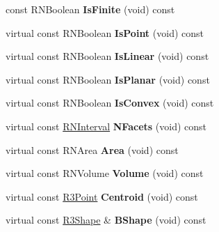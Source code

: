 \begin{DoxyCompactItemize}
\item 
const R\+N\+Boolean {\bfseries Is\+Finite} (void) const \hypertarget{class_r3_cone_a9983889501dc296f35d9a8d601694531}{}\label{class_r3_cone_a9983889501dc296f35d9a8d601694531}

\item 
virtual const R\+N\+Boolean {\bfseries Is\+Point} (void) const \hypertarget{class_r3_cone_ac8b05cdf5dd4f9edb2b68fa11017df2b}{}\label{class_r3_cone_ac8b05cdf5dd4f9edb2b68fa11017df2b}

\item 
virtual const R\+N\+Boolean {\bfseries Is\+Linear} (void) const \hypertarget{class_r3_cone_a075a96de795eaa0bd7d45a76f6596b4f}{}\label{class_r3_cone_a075a96de795eaa0bd7d45a76f6596b4f}

\item 
virtual const R\+N\+Boolean {\bfseries Is\+Planar} (void) const \hypertarget{class_r3_cone_a56722672136a2d5c21834fb7a51a7e78}{}\label{class_r3_cone_a56722672136a2d5c21834fb7a51a7e78}

\item 
virtual const R\+N\+Boolean {\bfseries Is\+Convex} (void) const \hypertarget{class_r3_cone_a2ae431236f7fa452e185af5b2d0f08e7}{}\label{class_r3_cone_a2ae431236f7fa452e185af5b2d0f08e7}

\item 
virtual const \hyperlink{class_r_n_interval}{R\+N\+Interval} {\bfseries N\+Facets} (void) const \hypertarget{class_r3_cone_a180faf8a99d70e07a6d76386f8d8ee90}{}\label{class_r3_cone_a180faf8a99d70e07a6d76386f8d8ee90}

\item 
virtual const R\+N\+Area {\bfseries Area} (void) const \hypertarget{class_r3_cone_af81eded59a3b364cb13f78baee7b249c}{}\label{class_r3_cone_af81eded59a3b364cb13f78baee7b249c}

\item 
virtual const R\+N\+Volume {\bfseries Volume} (void) const \hypertarget{class_r3_cone_a3cbae8c4d70a7ba10fde06d0389fdad0}{}\label{class_r3_cone_a3cbae8c4d70a7ba10fde06d0389fdad0}

\item 
virtual const \hyperlink{class_r3_point}{R3\+Point} {\bfseries Centroid} (void) const \hypertarget{class_r3_cone_aa24c568fd2dd3e120ab6e926ad300631}{}\label{class_r3_cone_aa24c568fd2dd3e120ab6e926ad300631}

\item 
virtual const \hyperlink{class_r3_shape}{R3\+Shape} \& {\bfseries B\+Shape} (void) const \hypertarget{class_r3_cone_a1a270603a87b4eb9da930cce7d02233e}{}\label{class_r3_cone_a1a270603a87b4eb9da930cce7d02233e}


\end{DoxyCompactItemize}
